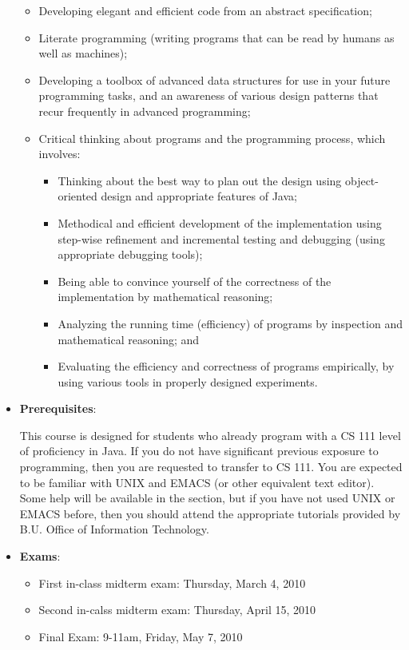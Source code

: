 \documentclass[11pt]{article}
\begin{document}
\begin{itemize}
\begin{itemize}
\item
Developing elegant and efficient code from an abstract specification;

\item
Literate programming (writing programs that can be read by humans as well
as machines);

\item
Developing a toolbox of advanced data structures for use in your future
programming tasks, and an awareness of various design patterns that recur
frequently in advanced programming;

\item
Critical thinking about programs and the programming process, which
involves:
\begin{itemize}
\item
Thinking about the best way to plan out the design using object-oriented
design and appropriate features of Java;
\item
Methodical and efficient development of the implementation using step-wise
refinement and incremental testing and debugging (using appropriate
debugging tools);
\item
Being able to convince yourself of the correctness of the implementation by
mathematical reasoning;
\item
Analyzing the running time (efficiency) of programs by inspection and
mathematical reasoning; and
\item
Evaluating the efficiency and correctness of programs empirically, by using
various tools in properly designed experiments.
\end{itemize}
\end{itemize}

\item {\bf Prerequisites}:

This course is designed for students who already program with a CS 111
level of proficiency in Java. If you do not have significant previous
exposure to programming, then you are requested to transfer to CS 111. You
are expected to be familiar with UNIX and EMACS (or other equivalent text
editor). Some help will be available in the section, but if you have not
used UNIX or EMACS before, then you should attend the appropriate tutorials
provided by B.U. Office of Information Technology.

\item {\bf Exams}:
\begin{itemize}
\item
First in-class midterm exam: Thursday, March 4, 2010 
\item
Second in-calss midterm exam: Thursday, April 15, 2010
\item
Final Exam: 9-11am, Friday, May 7, 2010 
\end{itemize}


\end{itemize}
\end{document}
